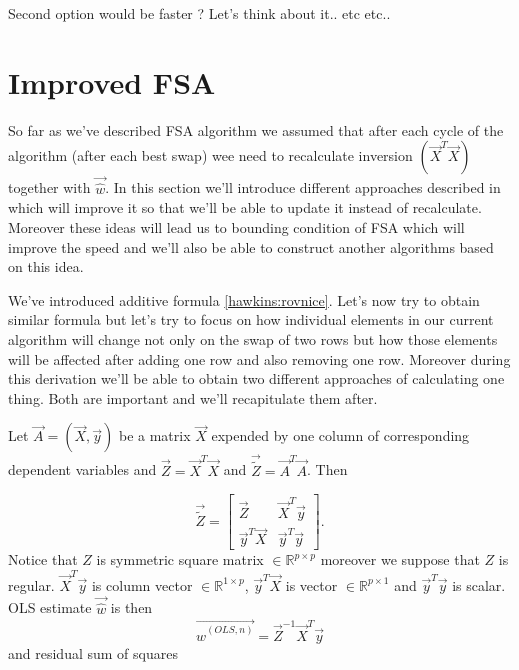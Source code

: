 Second option would be faster ? Let's think about it.. etc etc..


\section{Improved FSA} %
So far as we've described FSA algorithm we assumed that after each cycle of the algorithm (after each best swap) wee need to recalculate inversion $(\vec{X}^T\vec{X})$ together with $\vec{\hat{w}}$. In this section we'll introduce different approaches described in \cite{agullo2001new} which will improve it so that we'll be able to update it instead of recalculate. Moreover these ideas will lead us to bounding condition of FSA which will improve the speed and we'll also be able to construct another algorithms based on this idea. 

We've introduced additive formula \ref{hawkins:rovnice}. Let's now try to obtain similar formula but let's try to focus on how individual elements in our current algorithm will change not only on the swap of two rows but how those elements will be affected after adding one row and also removing one row. Moreover during this derivation we'll be able to obtain two different approaches of calculating one thing. Both are important and we'll recapitulate them after.


Let $\vec{A} = (\vec{X}, \vec{y})$ be a matrix $\vec{X}$ expended by one column of corresponding dependent variables and $\vec{Z} = \vec{X}^T\vec{X}$ and $\vec{\tilde{Z}} = \vec{A}^T\vec{A}$. Then

\[ 
	\vec{\tilde{Z}} = \begin{bmatrix}
		\vec{Z} & \vec{X}^T\vec{y} \\
    \vec{y}^T\vec{X} & \vec{y}^T\vec{y}
  \end{bmatrix} .
\]
Notice that $Z$ is symmetric square matrix $\in \mathbb{R}^ {p \times p}$ moreover we suppose that $Z$ is regular. $\vec{X}^T\vec{y}$ is column vector $\in \mathbb{R}^ {1 \times p}$, $\vec{y}^T\vec{X}$ is vector $\in \mathbb{R}^ {p \times 1}$ and $\vec{y}^T\vec{y}$ is scalar.
OLS estimate $\vec{\hat{w}}$ is then
\begin{equation}
	\vec{\hat{w}^{(OLS, n)}} = \vec{Z}^{-1} \vec{X}^T\vec{y}
\end{equation}
and residual sum of squares 

